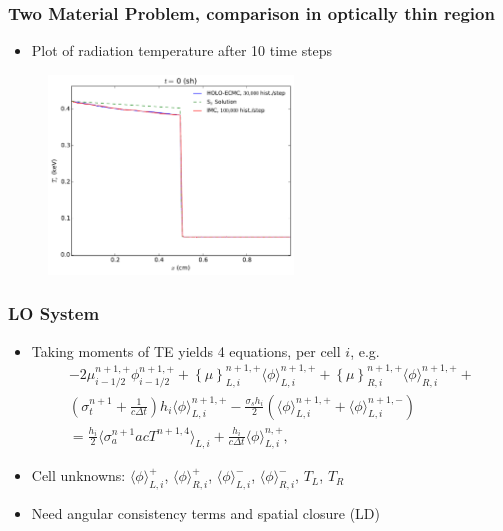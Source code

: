 \documentclass[xcolor=dvipsnames,hyperref={pdfpagelabels=false},unknownkeysallowed]{beamer}
\newcommand{\colb}[1]{{\color{blue} #1}}
\newlength{\wideitemsep}
\let\olditem\item
\renewcommand{\item}{\setlength{\itemsep}{\wideitemsep}\olditem}
\newcommand{\mom}[1]{\langle #1 \rangle}
\newcommand{\cur}[1]{\left\{ #1 \right\}}
\begin{document}
\begin{frame}
    \frametitle{Two Material Problem, comparison in optically thin region}
    \begin{block}{}
        \begin{itemize}
            \item Plot of radiation temperature after 10 time steps
        \end{itemize}
    \end{block}
\begin{figure}
    \centering
    \includegraphics[width=0.5799\textwidth]{quick_compare.pdf}
\end{figure}

\end{frame}




\begin{frame}
    \frametitle{LO System}
    \begin{itemize}
        \item Taking moments of TE yields \colb{4 equations}, per cell $i$, e.g.
\begin{multline}\label{lo_tran}
    -2{\mu}_{i-1/2}^{n+1,+} \phi_{i-1/2}^{n+1,+} + \cur {\mu}_{L,i}^{n+1,+}
  \mom{\phi}_{L,i}^{n+1,+}
  +  \cur\mu_{R,i}^{n+1,+}
  \mom{\phi}_{R,i}^{n+1,+} +  \\ \left(\sigma_t^{n+1}+\frac{1}{c \Delta t} \right) h_i 
  \mom{\phi}_{L,i}^{n+1,+} -  \frac{\sigma_s h_i}{2} \left( \mom{\phi}_{L,i}^{n+1,+} +
  \mom\phi_{L,i}^{n+1,-}\right) \\ = \frac{h_i}{2} \mom{\sigma_a^{n+1} a c T^{n+1,4}}_{L,i} +
  \frac{h_i}{c\Delta t}\mom{\phi}_{L,i}^{n,+},
\end{multline}
        \item Cell unknowns: $\mom{\phi}_{L,i}^{+}$, $\mom{\phi}_{R,i}^{+}$,
        $\mom{\phi}_{L,i}^{-}$, $\mom{\phi}_{R,i}^{-}$, $T_L$, $T_R$

    \item Need \colb{angular} consistency terms  and spatial closure
        (LD)
    \end{itemize}

\end{frame}
\end{document}
